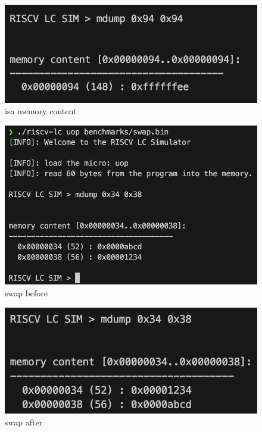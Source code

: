 \documentclass[12pt, a4paper]{article}
\begin{document}
\begin{ans}
    \begin{figure}[H]
        \caption{isa memory content}
        \includegraphics[width=1\linewidth]{../figs/isa-mdump.png}
    \end{figure}
    
    \begin{figure}[H]
        \caption{swap before}
        \includegraphics[width=1\linewidth]{../figs/swap-before-1.png}
    \end{figure}
    \begin{figure}[H]
        \caption{swap after}
        \includegraphics[width=1\linewidth]{../figs/swap-after-1.png}
    \end{figure}
\end{ans}
\end{document}
